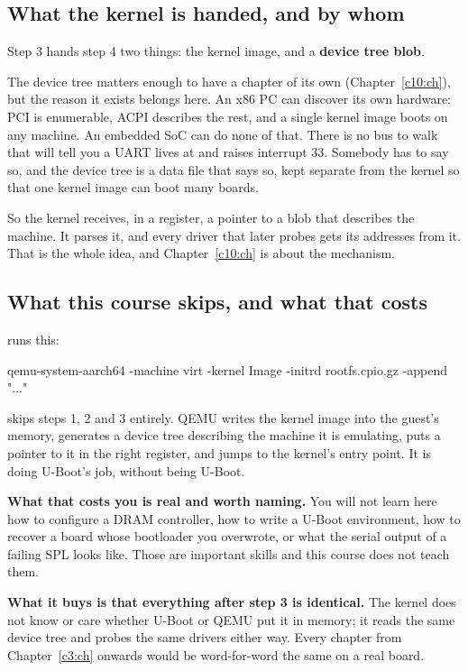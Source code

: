 \subsection{What the kernel is handed, and by whom}
\label{c1:app:a3}

Step 3 hands step 4 two things: the kernel image, and a \textbf{device tree blob}.

The device tree matters enough to have a chapter of its own (Chapter~\ref{c10:ch}), but the reason
it exists belongs here. An x86 PC can discover its own hardware: PCI is enumerable, ACPI describes
the rest, and a single kernel image boots on any machine. An embedded SoC can do none of that. There
is no bus to walk that will tell you a UART lives at  and raises interrupt 33.
Somebody has to say so, and the device tree is a data file that says so, kept separate from the
kernel so that one kernel image can boot many boards.

So the kernel receives, in a register, a pointer to a blob that describes the machine. It parses it,
and every driver that later probes gets its addresses from it. That is the whole idea, and
Chapter~\ref{c10:ch} is about the mechanism.

\subsection{What this course skips, and what that costs}
\label{c1:app:a4}

 runs this:

\begin{shell}
qemu-system-aarch64 -machine virt -kernel Image -initrd rootfs.cpio.gz -append "..."
\end{shell}

\noindent {} skips steps 1, 2 and 3 entirely. QEMU writes the kernel image into the
guest's memory, generates a device tree describing the machine it is emulating, puts a pointer to it
in the right register, and jumps to the kernel's entry point. It is doing U-Boot's job, without
being U-Boot.

\textbf{What that costs you is real and worth naming.} You will not learn here how to configure a
DRAM controller, how to write a U-Boot environment, how to recover a board whose bootloader you
overwrote, or what the serial output of a failing SPL looks like. Those are important skills and
this course does not teach them.

\textbf{What it buys is that everything after step 3 is identical.} The kernel does not know or care
whether U-Boot or QEMU put it in memory; it reads the same device tree and probes the same drivers
either way. Every chapter from Chapter~\ref{c3:ch} onwards would be word-for-word the same on a real
board.

